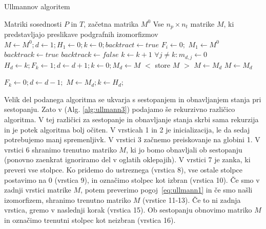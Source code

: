 \documentclass[a4paper, 12pt, ]{book}
\newcommand{\refalg}[1]{(Alg. \ref{#1})}
\begin{document}
\begin{algorithm}
\caption{Ullmannov algoritem}
\label{alg:ullmann1}
\begin{algorithmic}[1]
	\Require Matriki sosednosti $P$ in $T$, začetna matrika $M^0$
	\Ensure Vse $n_p \times n_t$ matrike $M$, ki predstavljajo preslikave podgrafnih izomorfizmov				
	\State $M \gets M^0; d \gets 1; H_1 \gets 0; k \gets 0; backtract \gets true$								
	 $F_i \gets 0;$ \EndFor													
	\State $M_1 \gets M^0$																	
		\State $backtrack \gets true$													
			\State $backtrack \gets false$
			\Repeat 
				\State $k \gets k +1$ 															
			\State $\forall j \not = k : m_{d,j} \gets 0$										\label{alg:ullmann1.11}
					\State $H_d \gets k; F_k \gets 1; d \gets d+1; k \gets 0; M_d \gets M$
				\Else																			
						\State $<$ store $M$ $>$
					\EndIf													
						\State $M \gets M_d$		
				\EndIf
			\Else
				\State $M \gets M_d$
			\EndIf
		\EndIf
		
			\State $F_k \gets 0; d \gets d-1;$													
				\State $M \gets M_d; k \gets H_d;$												
			\EndIf
		\EndIf
	\EndWhile
\end{algorithmic}
\end{algorithm}

	Velik del podanega algoritma se ukvarja s sestopanjem in obnavljanjem stanja pri sestopanju. Zato v \refalg{alg:ullmann3} podajamo še rekurzivno 
	različico algoritma. V tej različici za sestopanje in obnavljanje stanja skrbi sama rekurzija in je potek algoritma bolj očiten. V vrsticah 1 in 2 je
	inicializacija, le da sedaj potrebujemo manj spremenljivk. V vrstici 3 začnemo preiskovanje na globini 1. V vrstici 6 shranimo trenutno matriko $M$,
	ki jo bomo obnavljali ob sestopanju (ponovno zaenkrat ignoriramo del v oglatih oklepajih). V vrstici 7 je zanka, ki preveri vse stolpce. Ko pridemo do
	ustreznega (vrstica 8), vse ostale stolpce postavimo na 0 (vrstica 9), in označimo stolpec kot izbran (vrstica 10). Če smo v zadnji vrstici matrike $M$,
	potem preverimo pogoj~\ref{eq:ullmann1} in če smo našli izomorfizem, shranimo trenutno matriko $M$ (vrstice 11-13). Če to ni zadnja vrstica, gremo
	v naslednji korak (vrstica 15). Ob sestopanju obnovimo matriko $M$ in označimo trenutni stolpec kot neizbran (vrstica 16).
\end{document}
